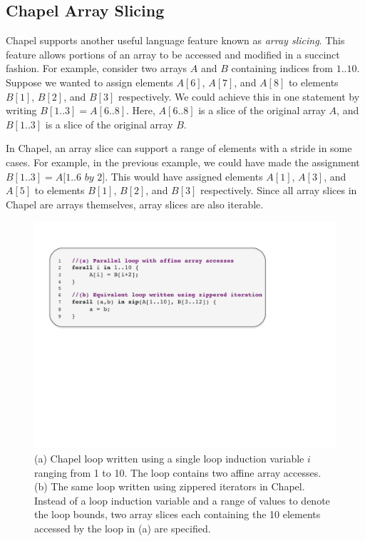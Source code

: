 \subsection{Chapel Array Slicing}\label{sec:array_slicing}

Chapel supports another useful language feature known as \textit{array slicing}. This feature allows portions of an array to be accessed and modified in a succinct fashion. For example, consider two arrays $A$ and $B$ containing indices from $1..10$. Suppose we wanted to assign elements $A[6]$, $A[7]$, and $A[8]$ to elements $B[1]$, $B[2]$, and $B[3]$ respectively. We could achieve this in one statement by writing $B[1..3] = A[6..8]$. Here, $A[6..8]$ is a slice of the original array $A$, and $B[1..3]$ is a slice of the original array $B$. 

In Chapel, an array slice can support a range of elements with a stride in some cases. For example, in the previous example, we could have made the assignment $B[1..3] = A[1..6$ $by$ $2]$. This would have assigned elements $A[1]$, $A[3]$, and $A[5]$ to elements $B[1]$, $B[2]$, and $B[3]$ respectively. Since all array slices in Chapel are arrays themselves, array slices are also iterable. 

\begin{figure}
	\begin{center}
	\includegraphics[scale=0.50]{./Figures/affine_loop}
	\caption{(a) Chapel loop written using a single loop induction variable $i$ ranging from 1 to 10. The loop contains two affine array accesses. (b) The same loop written using zippered iterators in Chapel. Instead of a loop induction variable and a range of values to denote the loop bounds, two array slices each containing the 10 elements accessed by the loop in (a) are specified.}
	\label{affine_loop}
	\end{center}
\end{figure}

